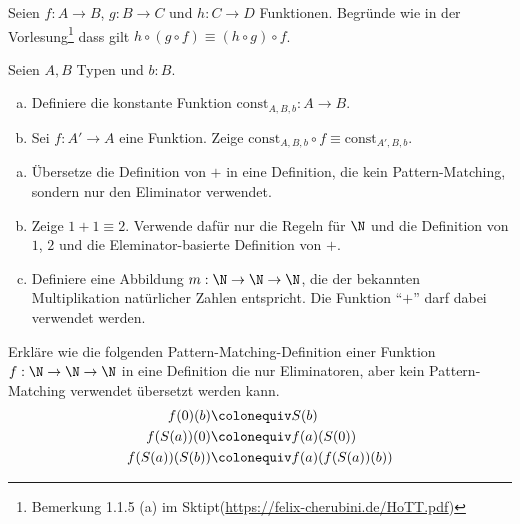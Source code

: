\documentclass{hott-übung}
\begin{document}
\setcounter{blattnummer}{1}
\setcounter{aufgabennummer}{0}

\blatt

  Seien $f:A\to B$, $g:B\to C$ und $h:C\to D$ Funktionen.
  Begründe wie in der Vorlesung\footnote{Bemerkung 1.1.5 (a) im Sktipt(\url{https://felix-cherubini.de/HoTT.pdf})} dass gilt $h\circ(g\circ f)\equiv (h\circ g)\circ f$.

  Seien $A,B$ Typen und $b:B$.
  \begin{enumerate}[(a)]
    \item Definiere die konstante Funktion $\mathrm{const}_{A,B,b}:A\to B$.
    \item Sei $f:A'\to A$ eine Funktion.
      Zeige $\mathrm{const}_{A,B,b}\circ f \equiv \mathrm{const}_{A',B,b}$.
  \end{enumerate}

\aufgabe{}
\begin{enumerate}[(a)]
\item Übersetze die Definition von $+$ in eine Definition, die kein Pattern-Matching, sondern nur den Eliminator verwendet.
\item Zeige $1+1\equiv 2$. Verwende dafür nur die Regeln für $\N$ und die Definition von $1$, $2$ und die Eleminator-basierte Definition von $+$.
\item Definiere eine Abbildung $m:\N\to\N\to\N$, die der bekannten Multiplikation natürlicher Zahlen entspricht. Die Funktion ``$+$'' darf dabei verwendet werden.
\end{enumerate}
  
  Erkläre wie die folgenden Pattern-Matching-Definition einer Funktion $f:\N\to\N\to\N$ in eine
  Definition die nur Eliminatoren, aber kein Pattern-Matching verwendet übersetzt werden kann.
  \begin{align*}
    f(0)(b) &\colonequiv S(b) \\
    f(S(a))(0) &\colonequiv f(a)(S(0)) \\
    f(S(a))(S(b)) &\colonequiv f(a)(f(S(a))(b))
  \end{align*}
\end{document}
